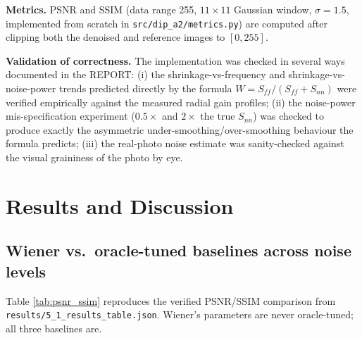 \documentclass[11pt]{article}
\begin{document}
\textbf{Metrics.} PSNR and SSIM (data range 255, $11\times11$ Gaussian window, $\sigma=1.5$,
implemented from scratch in \texttt{src/dip\_a2/metrics.py}) are computed after clipping both
the denoised and reference images to $[0,255]$.

\textbf{Validation of correctness.} The implementation was checked in several ways documented
in the REPORT: (i) the shrinkage-vs-frequency and shrinkage-vs-noise-power trends predicted
directly by the formula $W=S_{ff}/(S_{ff}+S_{nn})$ were verified empirically against the
measured radial gain profiles; (ii) the noise-power mis-specification experiment ($0.5\times$
and $2\times$ the true $S_{nn}$) was checked to produce exactly the asymmetric
under-smoothing/over-smoothing behaviour the formula predicts; (iii) the real-photo noise
estimate was sanity-checked against the visual graininess of the photo by eye.

\section{Results and Discussion}

\subsection{Wiener vs.\ oracle-tuned baselines across noise levels}

Table \ref{tab:psnr_ssim} reproduces the verified PSNR/SSIM comparison from
\texttt{results/5\_1\_results\_table.json}. Wiener's parameters are never oracle-tuned; all
three baselines are.
\end{document}
